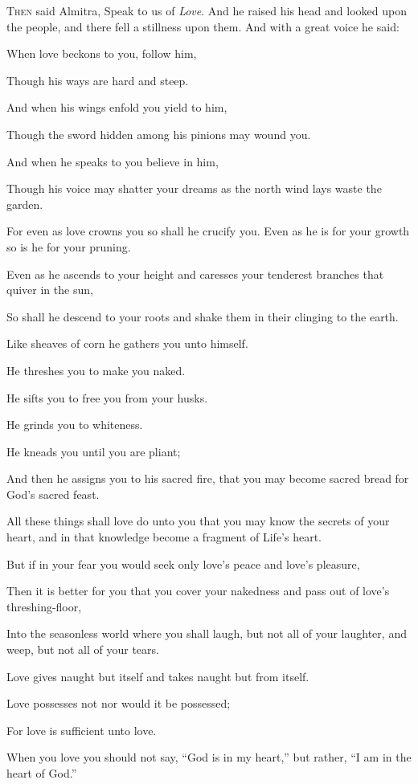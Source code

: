 \lettrine{T}{hen} said Almitra, Speak to us of
\textit{Love}.
And he raised his head and looked upon
the people, and there fell a stillness
upon them. And with a great voice he
said:
\medskip

When love beckons to you, follow him,

Though his ways are hard and steep.

And when his wings enfold you yield to
him,

Though the sword hidden among his
pinions may wound you.

And when he speaks to you believe in
him,

Though his voice may shatter your dreams
as the north wind lays waste the garden.

For even as love crowns you so shall
he crucify you. Even as he is for your
growth so is he for your pruning.

Even as he ascends to your height and
caresses your tenderest branches
that quiver in the sun,

So shall he descend to your roots and
shake them in their clinging to the
earth.

Like sheaves of corn he gathers you unto
himself.

He threshes you to make you naked.

He sifts you to free you from your
husks.

He grinds you to whiteness.

He kneads you until you are pliant;

And then he assigns you to his sacred
fire, that you may become sacred bread
for God’s sacred feast.

All these things shall love do unto you
that you may know the secrets of your
heart, and in that knowledge become a
fragment of Life’s heart.

But if in your fear you would seek only
love’s peace and love’s pleasure,

Then it is better for you that you
cover your nakedness and pass out of
love’s threshing-floor,

Into the seasonless world where you
shall laugh, but not all of your
laughter, and weep, but not all of your
tears.

Love gives naught but itself and takes
naught but from itself.

Love possesses not nor would it be
possessed;

For love is sufficient unto love.

When you love you should not say, \enquote{God
is in my heart,} but rather, \enquote{I am in
the heart of God.}

